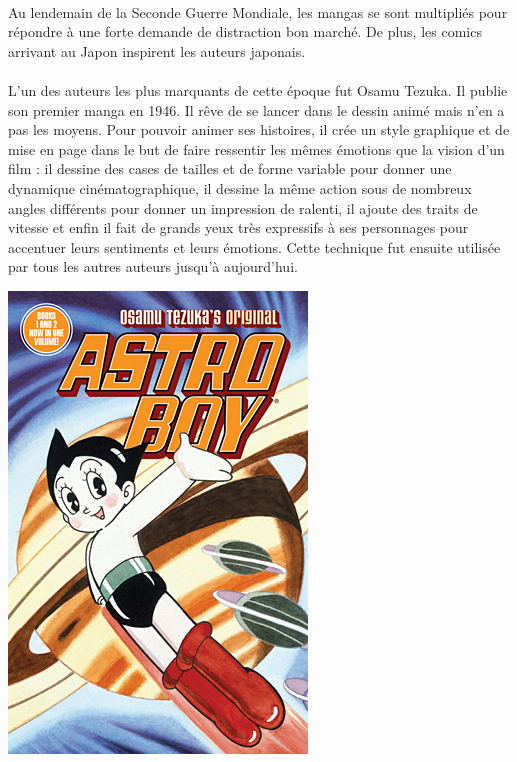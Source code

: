 \paragraph{} Au lendemain de la Seconde Guerre Mondiale, les mangas se sont
multipliés pour répondre à une forte demande de distraction bon marché. De
plus, les comics arrivant au Japon inspirent les auteurs japonais.

\paragraph{} L'un des auteurs les plus marquants de cette époque fut Osamu
Tezuka. Il publie son premier manga en 1946. Il rêve de se lancer dans le
dessin animé mais n'en a pas les moyens. Pour pouvoir animer ses histoires, il
crée un style graphique et de mise en page dans le but de faire ressentir les
mêmes émotions que la vision d'un film : il dessine des cases de tailles et de
forme variable pour donner une dynamique cinématographique, il dessine la même
action sous de nombreux angles différents pour donner un impression de ralenti,
il ajoute des traits de vitesse et enfin il fait de grands yeux très expressifs
à ses personnages pour accentuer leurs sentiments et leurs émotions. Cette
technique fut ensuite utilisée par tous les autres auteurs jusqu'à aujourd'hui.

\begin{center}
	\includegraphics[scale=0.4]{astroboy.jpg}
\end{center}

